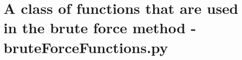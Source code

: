 
\chapter{A class of functions that are used in the brute force method - bruteForceFunctions.py} %

\label{AppendixC} %









